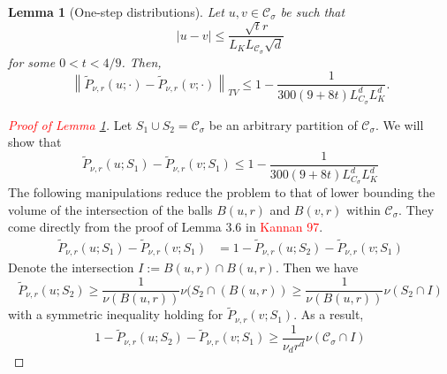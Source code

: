 \documentclass{article}
\newcommand{\norm}[1]{\left\lVert#1\right\rVert}
\newcommand{\abs}[1]{\left \lvert #1 \right \rvert}
\newcommand{\Cset}{\mathcal{C}}
\newcommand{\Csig}{\Cset_{\sigma}}
\newcommand{\1}{\mathbf{1}}
\theoremstyle{alden}
\theoremstyle{aldenthm}
\newtheorem{lemma}{Lemma}
\theoremstyle{remark}
\begin{document}
\begin{lemma}[One-step distributions]
	\label{lem: one_step_distributions}
	Let $u,v \in \Csig$ be such that 
	\begin{equation*}
	\abs{u - v} \leq \frac{\sqrt{t} r}{L_{K} L_{\Csig} \sqrt{d}}
	\end{equation*}
	for some $0 < t < 4/9$. Then,
	\begin{equation*}
	\norm{\widetilde{P}_{\nu,r}(u; \cdot) - \widetilde{P}_{\nu,r}(v; \cdot)}_{TV} \leq 1 - \frac{1}{300(9 + 8t)L_{C_{\sigma}}^d L_{K}^d}.
	\end{equation*}
\end{lemma}
\begin{proof}[\textcolor{red}{Proof of Lemma \ref{lem: one_step_distributions}}]
	Let $S_1 \cup S_2 = \Csig$ be an arbitrary partition of $\Csig$. We will show that 
	\begin{equation*}
	\widetilde{P}_{\nu,r}(u; S_1) - \widetilde{P}_{\nu,r}(v; S_1) \leq 1 - \frac{1}{300(9 + 8t)L_{C_{\sigma}}^d L_{K}^d}
	\end{equation*}
	The following manipulations reduce the problem to that of lower bounding the volume of the intersection of the balls $B(u,r)$ and $B(v,r)$ within $\Csig$. They come directly from the proof of Lemma 3.6 in \textcolor{red}{Kannan 97}. 
	\begin{align*}
	\widetilde{P}_{\nu,r}(u; S_1) - \widetilde{P}_{\nu,r}(v; S_1) & = 1 - \widetilde{P}_{\nu,r}(u; S_2) - \widetilde{P}_{\nu,r}(v; S_1)
	\end{align*}
	Denote the intersection $I := B(u,r) \cap B(u,r)$. Then we have
	\begin{equation*}
	\widetilde{P}_{\nu,r}(u; S_2) \geq \frac{1}{\nu(B(u,r))} \nu(S_2 \cap (B(u,r)) \geq \frac{1}{\nu(B(u,r))} \nu(S_2 \cap I)
	\end{equation*}
	with a symmetric inequality holding for $\widetilde{P}_{\nu,r}(v; S_1)$. As a result,
	\begin{equation}
	1 - \widetilde{P}_{\nu,r}(u; S_2) - \widetilde{P}_{\nu,r}(v; S_1) \geq \frac{1}{\nu_d r^d} \nu(\Csig \cap I) \label{eqn: one_step_1}
	\end{equation}
	

\end{proof}
\end{document}
